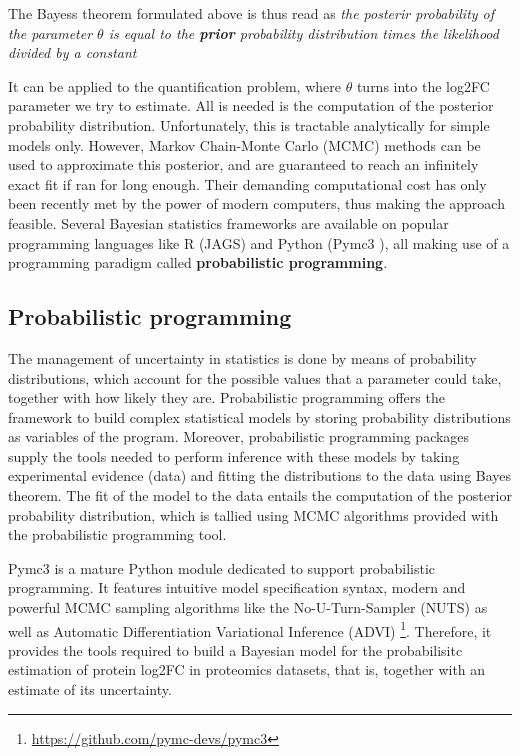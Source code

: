 The Bayes\textquotesingle s theorem formulated above is thus read as \textit{the posterir probability of the parameter $\theta$ is equal to the \textbf{prior} probability distribution times the likelihood divided by a constant}

It can be applied to the quantification problem, where $\theta$ turns into the log2FC parameter we try to estimate. All is needed is the computation of the posterior probability distribution. Unfortunately, this is tractable analytically for simple models only. However, Markov Chain-Monte Carlo (\ac{MCMC}) methods can be used to approximate this posterior, and are guaranteed to reach an infinitely exact fit if ran for long enough. Their demanding computational cost has only been recently met by the power of modern computers, thus making the approach feasible. Several Bayesian statistics frameworks are available on popular programming languages like R (JAGS) and Python (Pymc3 \cite{Salvatier2016}), all making use of a programming paradigm called \textbf{probabilistic programming}.

\subsection{Probabilistic programming}

The management of uncertainty in statistics is done by means of probability distributions, which account for the possible values that a parameter could take, together with how likely they are. Probabilistic programming offers the framework to build complex statistical models by storing probability distributions as variables of the program. Moreover, probabilistic programming packages supply the tools needed to perform inference with these models by taking experimental evidence (data) and fitting the distributions to the data using Bayes theorem. The fit of the model to the data entails the computation of the posterior probability distribution, which is tallied using \ac{MCMC} algorithms provided with the probabilistic programming tool.

Pymc3 is a mature Python module dedicated to support probabilistic programming. It features   intuitive model specification syntax, modern and powerful \ac{MCMC} sampling algorithms like the No-U-Turn-Sampler (\ac{NUTS}) as well as Automatic Differentiation Variational Inference (\ac{ADVI}) \footnote{\href{https://github.com/pymc-devs/pymc3}{https://github.com/pymc-devs/pymc3}}. Therefore, it provides the tools required to build a Bayesian model for the probabilisitc estimation of protein \ac{log2FC} in proteomics datasets, that is, together with an estimate of its uncertainty.


